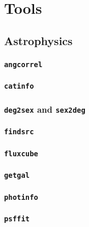 \documentclass[12pt]{report}
\begin{document}














\chapter{Tools \label{SEC:tool}}

\section{Astrophysics \label{SEC:tool:astro}}
\subsection{\texttt{angcorrel}} 
\subsection{\texttt{catinfo}} 
\subsection{\texttt{deg2sex} and \texttt{sex2deg}}  
\subsection{\texttt{findsrc}} 
\subsection{\texttt{fluxcube}} 
\subsection{\texttt{getgal}} 
\subsection{\texttt{photinfo}} 
\subsection{\texttt{psffit}} 
\end{document}
